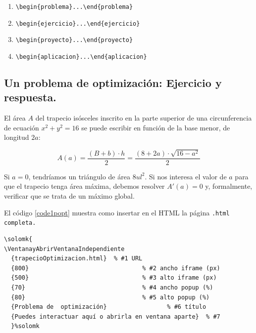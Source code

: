 \documentclass[fleqn,oneside]{article}
\begin{document}
\begin{enumerate}
        \item \lstinline+\begin{problema}...\end{problema}+
        \item \lstinline+\begin{ejercicio}...\end{ejercicio}+
        \item \lstinline+\begin{proyecto}...\end{proyecto}+
        \item \lstinline+\begin{aplicacion}...\end{aplicacion}+
    \end{enumerate}




    \subsection{Un problema de optimización: Ejercicio y respuesta.}

El área $A$ del trapecio isósceles inscrito en la parte superior de una circunferencia de ecuación $x^2+y^2=16$ se puede escribir en función de la base menor, de longitud $2a$:

\[
A(a) = \frac{(B + b) \cdot h}{2} = \frac{(8 + 2a) \cdot \sqrt{16 - a^2}}{2}
\]

Si $a=0$, tendríamos un triángulo de área $8ul^2$. Si nos interesa el valor de $a$ para que el trapecio tenga área máxima, debemos resolver $A'(a)=0$ y, formalmente, verificar que se trata de un máximo global.\\




El código \ref{code1popt} muestra como insertar en el HTML la página \tt{.html} completa.\\


\bigskip\begin{lstlisting}[caption={Problema de optimización},label={code1popt}]
\solomk{
\VentanayAbrirVentanaIndependiente
  {trapecioOptimizacion.html}  % #1 URL
  {800}                                % #2 ancho iframe (px)
  {500}                                % #3 alto iframe (px)
  {70}                                 % #4 ancho popup (%)
  {80}                                 % #5 alto popup (%)
  {Problema de  optimización}                 % #6 título
  {Puedes interactuar aquí o abrirla en ventana aparte}  % #7
  }%solomk
\end{lstlisting}
\end{document}
